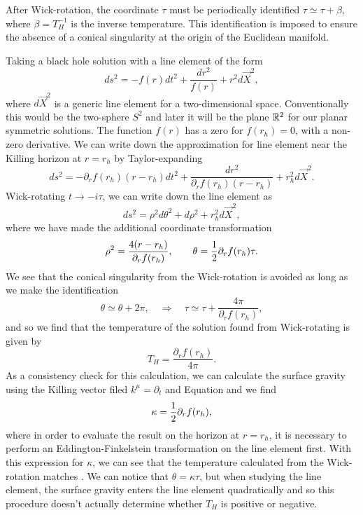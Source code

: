 After Wick-rotation, the coordinate $\tau$ must be periodically identified $\tau \simeq \tau + \beta$, where $\beta = T_H^{-1}$ is the inverse temperature. This identification is imposed to ensure the absence of a conical singularity at the origin of the Euclidean manifold. 

Taking a black hole solution with a line element of the form
\begin{equation*}
	ds^2 = - f(r) dt^2 + \frac{dr^2}{f(r)} + r^2 d\vec{X}^2, 
\end{equation*}
where $d\vec{X}^2$ is a generic line element for a two-dimensional space. Conventionally this would be the two-sphere $S^2$ and later it will be the plane ${\mathbb{R}}^2$ for our planar symmetric solutions. The function $f(r)$ has a zero for $f(r_h) = 0$, with a non-zero derivative. We can write down the approximation for line element near the Killing horizon at $r = r_h$ by Taylor-expanding
\begin{equation*}
	ds^2 = - \partial_r f(r_h) (r - r_h) dt^2 + \frac{dr^2}{\partial_r f(r_h) (r - r_h)} + r_h^2 d\vec{X}^2.
\end{equation*}
Wick-rotating $t \rightarrow -i \tau$, we can write down the line element as 
\begin{equation*}
	ds^2 = \rho^2 d\theta^2  + d\rho^2 + r_h^2 d\vec{X}^2,
\end{equation*}
where we have made the additional coordinate transformation
\begin{equation*}
	\rho^2 = \frac{4(r - r_h)}{\partial_r f(r_h)}, \qquad \theta = \frac{1}{2} \partial_r f(r_h) \tau.
\end{equation*}
We see that the conical singularity from the Wick-rotation is avoided as long as we make the identification
 \begin{equation*}
 	\theta \simeq \theta + 2 \pi, \quad \Rightarrow \quad \tau \simeq \tau + \frac{4 \pi}{\partial_r f(r_h)},
 \end{equation*}
 and so we find that the temperature of the solution found from Wick-rotating is given by
 \begin{equation*}
 	T_H = \frac{\partial_r f(r_h)}{4 \pi}.
 \end{equation*}
 As a consistency check for this calculation, we can calculate the surface gravity using the Killing vector filed $k^\mu = \partial_t$ and Equation  and we find
 \begin{equation*}
 	\kappa = \frac{1}{2} \partial_r f(r_h),
 \end{equation*}
 where in order to evaluate the result on the horizon at $r = r_h$, it is necessary to perform an Eddington-Finkelstein transformation on the line element first. With this expression for $\kappa$, we can see that the temperature calculated from the Wick-rotation matches . We can notice that $\theta = \kappa \tau$, but when studying the line element, the surface gravity enters the line element quadratically and so this procedure doesn't actually determine whether $T_H$ is positive or negative. 

